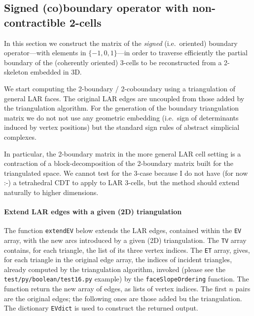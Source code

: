 \documentclass[11pt,oneside]{article}    %
\begin{document}
\subsection{Signed (co)boundary operator with non-contractible 2-cells}

In this section we construct the matrix of the \emph{signed} (i.e.~oriented) boundary operator---with elements in $\{-1,0,1\}$---in order to traverse efficiently the partial boundary of the (coherently oriented) 3-cells to be reconstructed from a 2-skeleton embedded in 3D.

We start computing the 2-boundary / 2-coboundary using a triangulation of general LAR faces.  The original LAR edges are uncoupled from those added by the triangulation algorithm. 
For the  generation of the boundary triangulation matrix we do not not use any geometric embedding (i.e.~sign of determinants induced by vertex positions) but the standard sign rules of abstract simplicial complexes.

In particular, the 2-boundary matrix in the more general LAR cell setting is a contraction of a block-decomposition of the 2-boundary matrix built for the triangulated space.  We cannot test for the 3-case because I do not have (for now :-) a tetrahedral CDT to apply to LAR 3-cells, but the method should extend naturally to higher dimensions.

\paragraph{Extend LAR edges with a given (2D) triangulation}

The function \texttt{extendEV} below extends the LAR edges, contained within the \texttt{EV} array, with the new arcs introduced by a given (2D) triangulation. The \texttt{TV} array contains, for each triangle, the list of its three vertex indices. The \texttt{ET} array, gives, for each triangle in the original edge array, the indices of incident triangles, already computed by the triangulation algorithm, invoked (please see the \texttt{test/py/boolean/test16.py} example) by the \texttt{faceSlopeOrdering} function.
The function return the new array of edges, as lists of vertex indices. The first $n$ pairs are the original edges; the following ones are those added bu the triangulation. The dictionary \texttt{EVdict} is used to construct the returned output.
\end{document}
